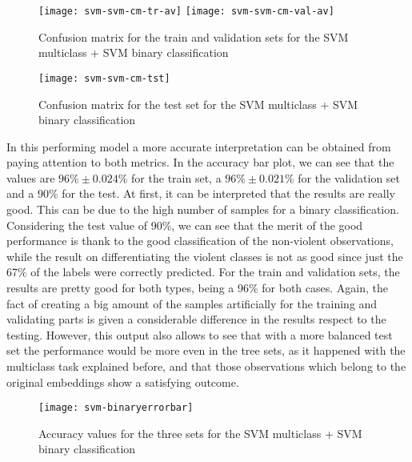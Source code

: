 	\begin{figure}[H]
		\hspace*{-2cm}
		\centering
		\captionsetup{justification=centering}
		\texttt{[image: svm-svm-cm-tr-av]}%
		\texttt{[image: svm-svm-cm-val-av]}
		\caption{Confusion matrix for the train and validation sets for the SVM multiclass + SVM binary classification}
		\label{fig:mesh23}
	\end{figure}
	
	\begin{figure}[H]
		\centering
		\captionsetup{justification=centering}
		\texttt{[image: svm-svm-cm-tst]}
		\caption{Confusion matrix for the test set for the SVM multiclass + SVM binary classification}
		\label{fig:mesh24}
	\end{figure}

	In this performing model a more accurate interpretation can be obtained from paying attention to both metrics. In the accuracy bar plot, we can see that the values are $96\% \pm 0.024\%$ for the train set, a $96\% \pm 0.021\%$ for the validation set and a $90\%$ for the test. At first, it can be interpreted that the results are really good. This can be due to the high number of samples for a binary classification. Considering the test value of 90\%, we can see that the merit of the good performance is thank to the good classification of the non-violent observations, while the result on differentiating the violent classes is not as good since just the 67\% of the labels were correctly predicted. For the train and validation sets, the results are pretty good for both types, being a 96\% for both cases. Again, the fact of creating a big amount of the samples artificially for the training and validating parts is given a considerable difference in the results respect to the testing. However, this output also allows to see that with a more balanced test set the performance would be more even in the tree sets, as it happened with the multiclass task explained before, and that those observations which belong to the original embeddings show a satisfying outcome.

	\begin{figure}[H]
		\centering
		\captionsetup{justification=centering}
		\texttt{[image: svm-binaryerrorbar]}
		\caption{Accuracy values for the three sets for the SVM multiclass + SVM binary classification}
		\label{fig:mesh25}
	\end{figure}

